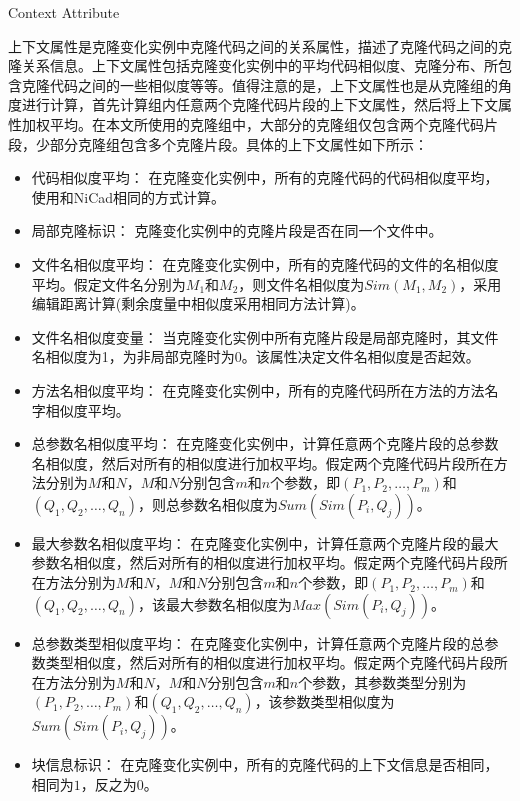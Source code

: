 {Context Attribute}

上下文属性是克隆变化实例中克隆代码之间的关系属性，描述了克隆代码之间的克隆关系信息。上下文属性包括克隆变化实例中的平均代码相似度、克隆分布、所包含克隆代码之间的一些相似度等等。值得注意的是，上下文属性也是从克隆组的角度进行计算，首先计算组内任意两个克隆代码片段的上下文属性，然后将上下文属性加权平均。在本文所使用的克隆组中，大部分的克隆组仅包含两个克隆代码片段，少部分克隆组包含多个克隆片段。具体的上下文属性如下所示：

\begin{itemize}
\item
代码相似度平均：
在克隆变化实例中，所有的克隆代码的代码相似度平均，使用和NiCad相同的方式计算\cite{roy2008nicad}。
\item
局部克隆标识：
克隆变化实例中的克隆片段是否在同一个文件中。
\item
文件名相似度平均：
在克隆变化实例中，所有的克隆代码的文件的名相似度平均。假定文件名分别为$M_1$和$M_2$，则文件名相似度为$Sim(M_1,M_2)$，采用编辑距离\cite{levenshtein1966binary}计算(剩余度量中相似度采用相同方法计算)。
\item
文件名相似度变量：
当克隆变化实例中所有克隆片段是局部克隆时，其文件名相似度为1，为非局部克隆时为0。该属性决定文件名相似度是否起效。
\item
方法名相似度平均：
在克隆变化实例中，所有的克隆代码所在方法的方法名字相似度平均。
\item
总参数名相似度平均：
在克隆变化实例中，计算任意两个克隆片段的总参数名相似度，然后对所有的相似度进行加权平均。假定两个克隆代码片段所在方法分别为$M$和$N$，$M$和$N$分别包含$m$和$n$个参数，即$(P_1,P_2,…,P_m)$和$(Q_1,Q_2,…,Q_n)$，则总参数名相似度为$Sum(Sim(P_i,Q_j))$。
\item
最大参数名相似度平均：
在克隆变化实例中，计算任意两个克隆片段的最大参数名相似度，然后对所有的相似度进行加权平均。假定两个克隆代码片段所在方法分别为$M$和$N$，$M$和$N$分别包含$m$和$n$个参数，即$(P_1,P_2,…,P_m)$和$(Q_1,Q_2,…,Q_n)$，该最大参数名相似度为$Max(Sim(P_i,Q_j))$。
\item 
总参数类型相似度平均：
在克隆变化实例中，计算任意两个克隆片段的总参数类型相似度，然后对所有的相似度进行加权平均。假定两个克隆代码片段所在方法分别为$M$和$N$，$M$和$N$分别包含$m$和$n$个参数，其参数类型分别为$(P_1,P_2,…,P_m)$和$(Q_1,Q_2,…,Q_n)$，该参数类型相似度为$Sum(Sim(P_i,Q_j))$。
\item
块信息标识：
在克隆变化实例中，所有的克隆代码的上下文信息是否相同，相同为$1$，反之为$0$。
\end{itemize}

